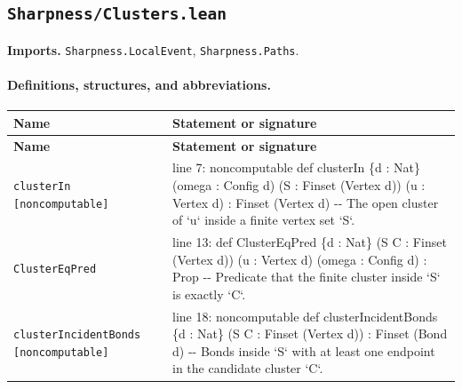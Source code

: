 \documentclass[10pt]{article}
\newcommand{\module}[1]{\texttt{#1}}
\begin{document}
\subsection*{\module{Sharpness/Clusters.lean}}
\textbf{Imports.} \module{Sharpness.LocalEvent}, \module{Sharpness.Paths}.
\paragraph{Definitions, structures, and abbreviations.}
\begin{longtable}{>{\raggedright\arraybackslash}p{} >{\raggedright\arraybackslash}p{}}
\textbf{Name} & \textbf{Statement or signature} \\
\hline
\endfirsthead
\textbf{Name} & \textbf{Statement or signature} \\
\hline
\endhead
\texttt{clusterIn [noncomputable]} & {\ttfamily\scriptsize line 7:\allowbreak{} noncomputable def clusterIn \{d :\allowbreak{} Nat\} (\allowbreak{}omega :\allowbreak{} Config d)\allowbreak{} (\allowbreak{}S :\allowbreak{} Finset (\allowbreak{}Vertex d)\allowbreak{})\allowbreak{} (\allowbreak{}u :\allowbreak{} Vertex d)\allowbreak{} :\allowbreak{} Finset (\allowbreak{}Vertex d)\allowbreak{} -\allowbreak{}-\allowbreak{} The open cluster of `u` inside a finite vertex set `S`.\allowbreak{}} \\[0.45em]
\texttt{ClusterEqPred} & {\ttfamily\scriptsize line 13:\allowbreak{} def ClusterEqPred \{d :\allowbreak{} Nat\} (\allowbreak{}S C :\allowbreak{} Finset (\allowbreak{}Vertex d)\allowbreak{})\allowbreak{} (\allowbreak{}u :\allowbreak{} Vertex d)\allowbreak{} (\allowbreak{}omega :\allowbreak{} Config d)\allowbreak{} :\allowbreak{} Prop -\allowbreak{}-\allowbreak{} Predicate that the finite cluster inside `S` is exactly `C`.\allowbreak{}} \\[0.45em]
\texttt{clusterIncidentBonds [noncomputable]} & {\ttfamily\scriptsize line 18:\allowbreak{} noncomputable def clusterIncidentBonds \{d :\allowbreak{} Nat\} (\allowbreak{}S C :\allowbreak{} Finset (\allowbreak{}Vertex d)\allowbreak{})\allowbreak{} :\allowbreak{} Finset (\allowbreak{}Bond d)\allowbreak{} -\allowbreak{}-\allowbreak{} Bonds inside `S` with at least one endpoint in the candidate cluster `C`.\allowbreak{}} \\[0.45em]
\end{longtable}
\end{document}
